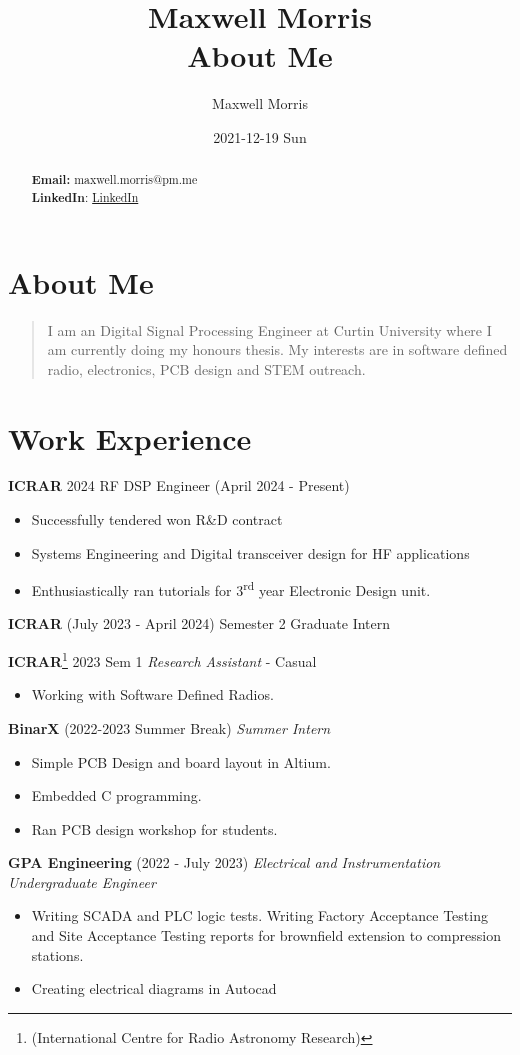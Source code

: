 \documentclass[11pt]{article}
\author{Maxwell Morris}
\date{2021-12-19 Sun}
\title{Maxwell Morris\\\medskip
\large About Me}
\begin{document}
\maketitle
\begin{abstract}
\textbf{Email:} maxwell.morris@pm.me\\[0pt]
\textbf{LinkedIn}: \href{https://www.linkedin.com/in/maxwell-morris-a38438177}{LinkedIn}
\end{abstract}

\section*{About Me}
\label{sec:org6818279}

\begin{quote}
I am an Digital Signal Processing Engineer at Curtin University where I am currently doing my honours thesis. My interests are in software defined radio, electronics, PCB design and STEM outreach.
\end{quote}

\section*{Work Experience}
\label{sec:org3008ffb}
\textbf{ICRAR} 2024 RF DSP Engineer  (April 2024 - Present)
\begin{itemize}
\item Successfully tendered won R\&D contract
\item Systems Engineering and Digital transceiver design for HF applications
\item Enthusiastically ran tutorials for 3\textsuperscript{rd} year Electronic Design unit.
\end{itemize}

\textbf{ICRAR} (July 2023 - April 2024) Semester 2 Graduate Intern

\textbf{ICRAR}\footnote{(International Centre for Radio Astronomy Research)} 2023 Sem 1 \emph{Research Assistant} - Casual
\begin{itemize}
\item Working with Software Defined Radios.
\end{itemize}
\textbf{BinarX} (2022-2023 Summer Break) \emph{Summer Intern}
\begin{itemize}
\item Simple PCB Design and board layout in Altium.
\item Embedded C programming.
\item Ran PCB design workshop for students.
\end{itemize}
\textbf{GPA Engineering} (2022 - July 2023) \emph{Electrical and Instrumentation Undergraduate Engineer}
\begin{itemize}
\item Writing SCADA and PLC logic tests. Writing Factory Acceptance Testing and Site Acceptance Testing reports for brownfield extension to compression stations.
\item Creating electrical diagrams in Autocad
\end{itemize}
\end{document}
